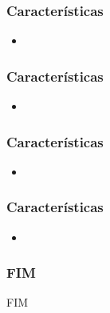 \documentclass[]{beamer}
\begin{document}
\begin{frame}
  \frametitle{Características}
\begin{itemize}
  \item 
\end{itemize}
\end{frame}

\begin{frame}
  \frametitle{Características}
\begin{itemize}
  \item 
\end{itemize}
\end{frame}

\begin{frame}
  \frametitle{Características}
\begin{itemize}
  \item 
\end{itemize}
\end{frame}

\begin{frame}
  \frametitle{Características}
\begin{itemize}
  \item 
\end{itemize}
\end{frame}






\begin{frame}
 \frametitle{FIM}
   FIM%
\end{frame}


%
%
\end{document}
